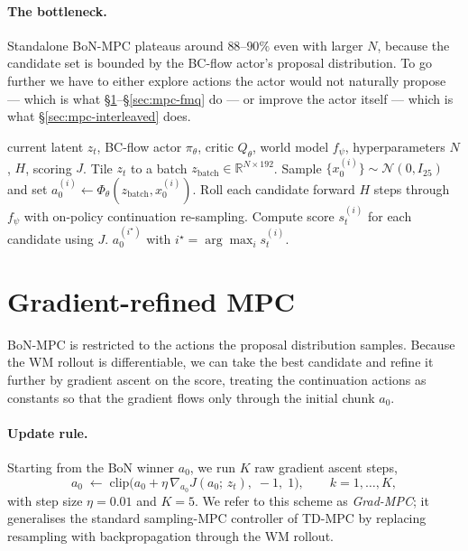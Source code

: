 \paragraph{The bottleneck.}
Standalone BoN-MPC plateaus around $88$--$90\%$ even with larger $N$,
because the candidate set is bounded by the BC-flow actor's proposal
distribution. To go further we have to either explore actions the
actor would not naturally propose --- which is what
§\ref{sec:mpc-grad}--§\ref{sec:mpc-fmq} do --- or improve the actor
itself --- which is what §\ref{sec:mpc-interleaved} does.

\begin{algorithm}[t]
\caption{Best-of-$N$ MPC inference.}
\label{alg:mpc-bon}
\begin{algorithmic}[1]
\Require current latent $z_t$, BC-flow actor $\pi_\theta$, critic $Q_\theta$, world model $f_\psi$, hyperparameters $N$, $H$, scoring $J$.
\State Tile $z_t$ to a batch $z_{\text{batch}} \in \mathbb{R}^{N \times 192}$.
\State Sample $\{x_0^{(i)}\} \sim \mathcal{N}(0, I_{25})$ and set $a_0^{(i)} \leftarrow \Phi_\theta(z_{\text{batch}}, x_0^{(i)})$.
\State Roll each candidate forward $H$ steps through $f_\psi$ with on-policy continuation re-sampling.
\State Compute score $s_t^{(i)}$ for each candidate using $J$.
\State \Return $a_0^{(i^\star)}$ with $i^\star = \arg\max_i s_t^{(i)}$.
\end{algorithmic}
\end{algorithm}

\section{Gradient-refined MPC}
\label{sec:mpc-grad}

BoN-MPC is restricted to the actions the proposal distribution
samples. Because the WM rollout is differentiable, we can take the
best candidate and refine it further by gradient ascent on the score,
treating the continuation actions as constants so that the gradient
flows only through the initial chunk $a_0$.

\paragraph{Update rule.}
Starting from the BoN winner $a_0$, we run $K$ raw gradient ascent
steps,
\begin{equation}
    a_0 \;\leftarrow\; \mathrm{clip}\!\Big(a_0 + \eta\,\nabla_{a_0} J(a_0;\,z_t),\;-1,\;1\Big),
    \qquad k = 1, \dots, K,
    \label{eq:mpc-grad}
\end{equation}
with step size $\eta = 0.01$ and $K=5$. We refer to this scheme as
\emph{Grad-MPC}; it generalises the standard sampling-MPC controller
of TD-MPC \cite{hansen2022tdmpc, hansen2024tdmpc2} by replacing
resampling with backpropagation through the WM rollout.

